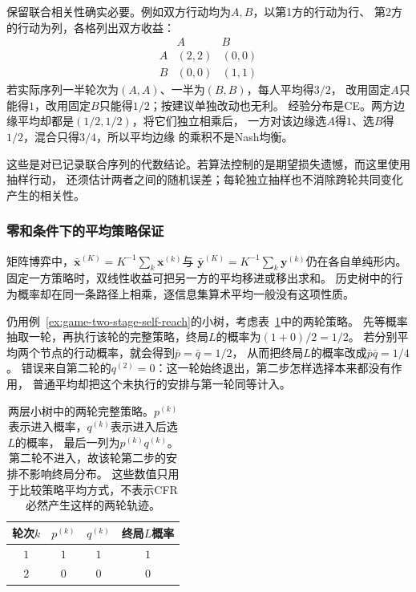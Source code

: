 保留联合相关性确实必要。例如双方行动均为\(A,B\)，以第1方的行动为行、
第2方的行动为列，各格列出双方收益：
\[
  \begin{array}{c|cc}
     &A&B\\ \hline
    A&(2,2)&(0,0)\\
    B&(0,0)&(1,1)
  \end{array}
\]
若实际序列一半轮次为\((A,A)\)、一半为\((B,B)\)，每人平均得\(3/2\)，
改用固定\(A\)只能得\(1\)，改用固定\(B\)只能得\(1/2\)；按建议单独改动也无利。
经验分布是CE。两方边缘平均却都是\((1/2,1/2)\)，将它们独立相乘后，
一方对该边缘选\(A\)得\(1\)、选\(B\)得\(1/2\)，混合只得\(3/4\)，所以平均边缘
的乘积不是Nash均衡。

这些是对已记录联合序列的代数结论。若算法控制的是期望损失遗憾，而这里使用抽样行动，
还须估计两者之间的随机误差；每轮独立抽样也不消除跨轮共同变化产生的相关性。

\subsubsection{零和条件下的平均策略保证}
\label{sec:game-zero-sum-average}

矩阵博弈中，\(\bar{\bm x}^{(K)}=K^{-1}\sum_k\bm x^{(k)}\)与
\(\bar{\bm y}^{(K)}=K^{-1}\sum_k\bm y^{(k)}\)仍在各自单纯形内。
固定一方策略时，双线性收益可把另一方的平均移进或移出求和。
历史树中的行为概率却在同一条路径上相乘，逐信息集算术平均一般没有这项性质。

仍用例~\ref{ex:game-two-stage-self-reach}的小树，考虑表~\ref{tab:game-two-stage-average}中的两轮策略。
先等概率抽取一轮，再执行该轮的完整策略，终局$L$的概率为$(1+0)/2=1/2$。
若分别平均两个节点的行动概率，就会得到$\bar p=\bar q=1/2$，
从而把终局$L$的概率改成$\bar p\bar q=1/4$。
错误来自第二轮的$q^{(2)}=0$：这一轮始终退出，第二步怎样选择本来都没有作用，
普通平均却把这个未执行的安排与第一轮同等计入。

\begin{table}[htbp]
  \centering
  \setlength{\tabcolsep}{4pt}
  \begin{tabular}{cccc}
    \toprule
    轮次$k$ & $p^{(k)}$ & $q^{(k)}$ & 终局$L$概率\\
    \midrule
    $1$ & $1$ & $1$ & $1$\\
    $2$ & $0$ & $0$ & $0$\\
    \bottomrule
  \end{tabular}
  \caption{两层小树中的两轮完整策略。$p^{(k)}$表示进入概率，$q^{(k)}$表示进入后选$L$的概率，
  最后一列为$p^{(k)}q^{(k)}$。第二轮不进入，故该轮第二步的安排不影响终局分布。
  这些数值只用于比较策略平均方式，不表示CFR必然产生这样的两轮轨迹。}
  \label{tab:game-two-stage-average}
\end{table}

